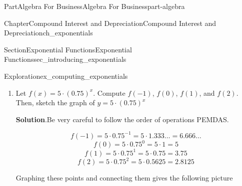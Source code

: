 \documentclass[oneside,10pt,]{tufte-book}
\newcommand{\blocktitlefont}{\relax}
\numberwithin{equation}{chapter}
\begin{document}
\begin{partptx}{Part}{Algebra For Business}{}{Algebra For Business}{}{}{part-algebra}
\begin{chapterptx}{Chapter}{Compound Interest and Depreciation}{}{Compound Interest and Depreciation}{}{}{ch_exponentials}
\begin{sectionptx}{Section}{Exponential Functions}{}{Exponential Functions}{}{}{sec_introducing_exponentials}
\begin{exploration}{Exploration}{}{ex_computing_exponentials}
\begin{enumerate}[font=\bfseries,label=(\alph*),ref=\alph*]
\begin{image}{0.25}{0.5}{0.25}{}
{
}%
\end{image}%
\item{}Let \(f(x) = 5\cdot (0.75)^x\). Compute  \(f(-1)\), \(f(0)\), \(f(1)\), and \(f(2)\). Then, sketch the graph of \(y=5\cdot (0.75)^x\)%
\par\smallskip%
\noindent\textbf{\blocktitlefont Solution}.\hypertarget{ex_computing_exponentials-3-2}{}\quad{}Be very careful to follow the order of operations PEMDAS.%
\par
%
\begin{equation*}
f(-1) = 5\cdot 0.75^{-1} = 5 \cdot 1.333\dots  = 6.666\dots
\end{equation*}
%
\begin{equation*}
f(0) = 5\cdot 0.75^{0} = 5 \cdot 1 = 5
\end{equation*}
%
\begin{equation*}
f(1) = 5\cdot 0.75^{1} = 5 \cdot 0.75 = 3.75
\end{equation*}
%
\begin{equation*}
f(2) = 5\cdot 0.75^{2} = 5 \cdot 0.5625 = 2.8125
\end{equation*}
%
\par
Graphing these points and connecting them gives the following picture%
\begin{image}{0.25}{0.5}{0.25}{}%
\end{image}
\end{enumerate}
\end{exploration}
\end{sectionptx}
\end{chapterptx}
\end{partptx}
\end{document}
